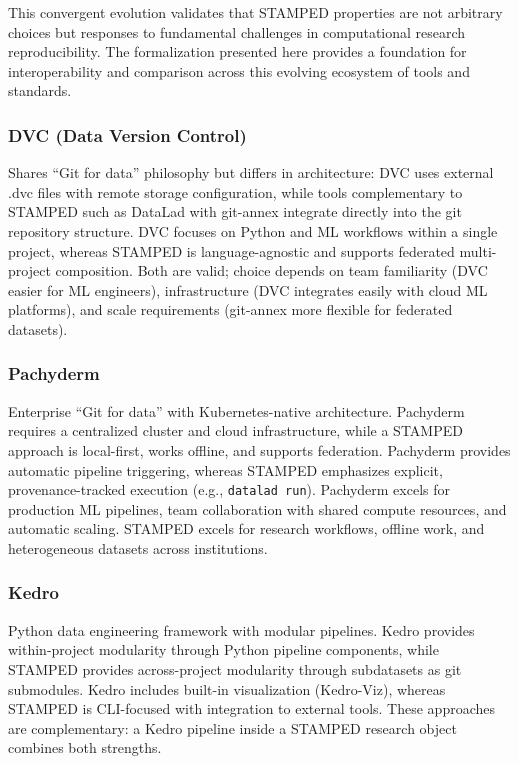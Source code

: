 \documentclass{article}
\begin{document}
This convergent evolution validates that STAMPED properties are not arbitrary choices but responses to fundamental challenges in computational research reproducibility.
The formalization presented here provides a foundation for interoperability and comparison across this evolving ecosystem of tools and standards.

\subsubsection{DVC (Data Version Control)}
Shares ``Git for data'' philosophy but differs in architecture:
DVC uses external .dvc files with remote storage configuration, while tools complementary to STAMPED such as DataLad with git-annex integrate directly into the git repository structure.
DVC focuses on Python and ML workflows within a single project, whereas STAMPED is language-agnostic and supports federated multi-project composition.
Both are valid; choice depends on team familiarity (DVC easier for ML engineers), infrastructure (DVC integrates easily with cloud ML platforms), and scale requirements (git-annex more flexible for federated datasets).

\subsubsection{Pachyderm}
Enterprise ``Git for data'' with Kubernetes-native architecture.
Pachyderm requires a centralized cluster and cloud infrastructure, while a STAMPED approach is local-first, works offline, and supports federation.
Pachyderm provides automatic pipeline triggering, whereas STAMPED emphasizes explicit, provenance-tracked execution (e.g., \texttt{datalad run}).
Pachyderm excels for production ML pipelines, team collaboration with shared compute resources, and automatic scaling.
STAMPED excels for research workflows, offline work, and heterogeneous datasets across institutions.

\subsubsection{Kedro}
Python data engineering framework with modular pipelines.
Kedro provides within-project modularity through Python pipeline components, while STAMPED provides across-project modularity through subdatasets as git submodules.
Kedro includes built-in visualization (Kedro-Viz), whereas STAMPED is CLI-focused with integration to external tools.
These approaches are complementary: a Kedro pipeline inside a STAMPED research object combines both strengths.
\end{document}
